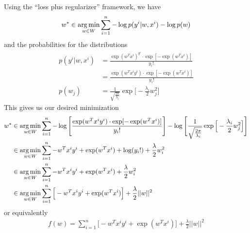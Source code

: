 \begin{enumerate}
	Using the ``loss plus regularizer'' framework, we have
	\begin{align*}
		w^* \in \mathop{\rm arg\,min}_{w \in W} \sum_{i=1}^n -\log p(y^i | w, x^i) - \log p(w)
	\end{align*}
	and the probabilities for the distributions
	\begin{align*}
		p(y^i | w, x^i) & = \frac{\exp (w^Tx^i)^{y^i} \cdot \exp[- \exp(w^Tx^i)]}{y_i!}\\
		& = \frac{\exp (w^Tx^iy^i) \cdot \exp[- \exp(w^Tx^i)]}{y_i!} \\
		p(w_j) & = \frac{1}{\sqrt{\frac{2\pi}{\lambda_i}}} \exp \Big[- \frac{\lambda_i}{2} w_j^2\Big]
	\end{align*}
	This gives us our desired minimization
	\begin{align*}
		w^* & \in \mathop{\rm arg\,min}_{w \in W} \sum_{i=1}^n -\log \Bigg[\frac{\exp (w^Tx^iy^i) \cdot \exp[- \exp(w^Tx^i)]}{y_i!}  \Bigg] - \log \Bigg[\frac{1}{\sqrt{\frac{2\pi}{\lambda_i}}} \exp \Big[- \frac{\lambda_i}{2} w_j^2\Big] \Bigg] \\
		& \in \mathop{\rm arg\,min}_{w \in W} \sum_{i=1}^n -w^Tx^iy^i + \exp(w^Tx^i) + \log(y_i!) + \frac{\lambda}{2} w_i^2 \\
		& \in \mathop{\rm arg\,min}_{w \in W} \sum_{i=1}^n -w^Tx^iy^i + \exp(w^Tx^i) + \frac{\lambda}{2} w_i^2 \\
		& \in \mathop{\rm arg\,min}_{w \in W} \sum_{i=1}^n \Big[-w^Tx^iy^i + \exp(w^Tx^i)\Big] + \frac{\lambda}{2} ||w||^2
	\end{align*}
	or equivalently
	\begin{align*}
		f(w) = \sum_{i=1}^n \Big[-w^Tx^iy^i + \exp(w^Tx^i) \Big] + \frac{\lambda}{2} ||w||^2
	\end{align*}
\end{enumerate}


